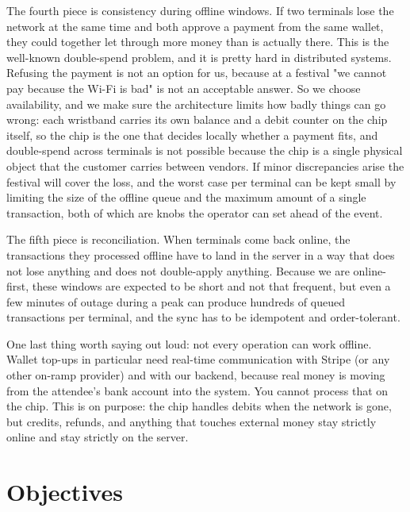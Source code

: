 The fourth piece is consistency during offline windows. If two terminals lose the network at the same time and both approve a payment from the same wallet, they could together let through more money than is actually there. This is the well-known double-spend problem, and it is pretty hard in distributed systems. Refusing the payment is not an option for us, because at a festival "we cannot pay because the Wi-Fi is bad" is not an acceptable answer. So we choose availability, and we make sure the architecture limits how badly things can go wrong: each wristband carries its own balance and a debit counter on the chip itself, so the chip is the one that decides locally whether a payment fits, and double-spend across terminals is not possible because the chip is a single physical object that the customer carries between vendors. If minor discrepancies arise the festival will cover the loss, and the worst case per terminal can be kept small by limiting the size of the offline queue and the maximum amount of a single transaction, both of which are knobs the operator can set ahead of the event.

The fifth piece is reconciliation. When terminals come back online, the transactions they processed offline have to land in the server in a way that does not lose anything and does not double-apply anything. Because we are online-first, these windows are expected to be short and not that frequent, but even a few minutes of outage during a peak can produce hundreds of queued transactions per terminal, and the sync has to be idempotent and order-tolerant.

One last thing worth saying out loud: not every operation can work offline. Wallet top-ups in particular need real-time communication with Stripe (or any other on-ramp provider) and with our backend, because real money is moving from the attendee's bank account into the system. You cannot process that on the chip. This is on purpose: the chip handles debits when the network is gone, but credits, refunds, and anything that touches external money stay strictly online and stay strictly on the server.

\section{Objectives}
\label{sec:objectives}

